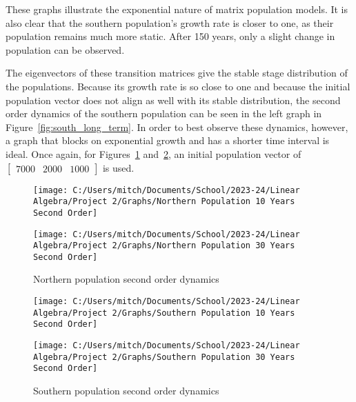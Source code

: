 \documentclass{article}
\begin{document}
    These graphs illustrate the exponential nature of matrix population models.
    It is also clear that the southern population's growth rate is closer to one, as their population remains much more static.
    After 150 years, only a slight change in population can be observed.

    The eigenvectors of these transition matrices give the stable stage distribution of the populations.
    Because its growth rate is so close to one and because the initial population vector does not align as well with its stable distribution, the second order dynamics of the southern population can be seen in the left graph in Figure~\ref{fig:south_long_term}.
    In order to best observe these dynamics, however, a graph that blocks on exponential growth and has a shorter time interval is ideal.
    Once again, for Figures~\ref{fig:north_second_order} and~\ref{fig:south_second_order}, an initial population vector of $\begin{bmatrix} 7000 & 2000 & 1000\end{bmatrix}$ is used.

    \begin{figure} [!h]
        \begin{minipage}{0.5\linewidth}
            \centering
            \texttt{[image: C:/Users/mitch/Documents/School/2023-24/Linear Algebra/Project 2/Graphs/Northern Population 10 Years Second Order]}
        \end{minipage}\hfill
        \begin{minipage}{0.5\linewidth}
            \centering
            \texttt{[image: C:/Users/mitch/Documents/School/2023-24/Linear Algebra/Project 2/Graphs/Northern Population 30 Years Second Order]}
        \end{minipage}
        \caption{Northern population second order dynamics}
        \label{fig:north_second_order}
    \end{figure}

    \begin{figure} [!h]
        \begin{minipage}{0.5\linewidth}
            \centering
            \texttt{[image: C:/Users/mitch/Documents/School/2023-24/Linear Algebra/Project 2/Graphs/Southern Population 10 Years Second Order]}
        \end{minipage}\hfill
        \begin{minipage}{0.5\linewidth}
            \centering
            \texttt{[image: C:/Users/mitch/Documents/School/2023-24/Linear Algebra/Project 2/Graphs/Southern Population 30 Years Second Order]}
        \end{minipage}
        \caption{Southern population second order dynamics}
        \label{fig:south_second_order}
    \end{figure}
\end{document}
